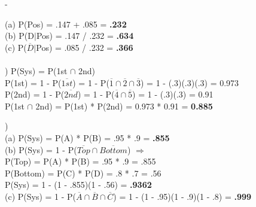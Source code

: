 -\documentclass[12pt]{article}
\begin{document}
\indent (a) P(Pos) = .147 + .085 = \textbf{.232}\\
\indent (b) P(D$|$Pos) = .147 / .232 = \textbf{.634}\\
\indent (c) P($\overline{D}|$Pos) = .085 / .232 = \textbf{.366}\\


\noindent \hrulefill \\


) P(Sys) = P(1st $\cap$ 2nd) \\
\indent P(1st) = 1 - P($\overline{1st}$) = 1 - P($\overline{1} \cap \overline{2} \cap \overline{3}$) = 1 - (.3)(.3)(.3) = 0.973\\
\indent P(2nd) = 1 - P($\overline{2nd}$) = 1 - P($\overline{4} \cap \overline{5}$) = 1 - (.3)(.3) = 0.91\\
\indent P(1st $\cap$ 2nd) = P(1st) * P(2nd) = 0.973 * 0.91 = \textbf{0.885}\\


\noindent \hrulefill 
\pagebreak


)\\
\indent (a) P(Sys) = P(A) * P(B) = .95 * .9 = \textbf{.855}\\

\indent (b) P(Sys) = 1 - P($\overline{Top} \cap \overline{Bottom}$) $\Rightarrow$\\
\indent \indent P(Top) = P(A) * P(B) = .95 * .9 = .855\\
\indent \indent P(Bottom) = P(C) * P(D) = .8 * .7 = .56\\
\indent \indent P(Sys) = 1 - (1 - .855)(1 - .56) = \textbf{.9362}\\

\indent (c) P(Sys) = 1 -  P($\overline{A} \cap \overline{B} \cap \overline{C}$) = 1 - (1 - .95)(1 - .9)(1 - .8) = \textbf{.999}
\end{document}
